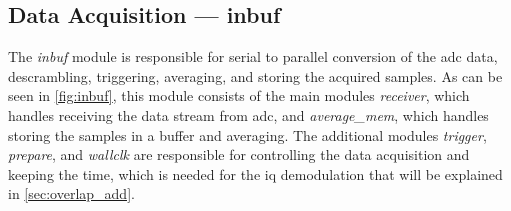 \documentclass[12pt,a4paper,parskip=full,abstract=true,BCOR=12mm]{scrreprt}
\def\device#1{\mbox{\textit{#1}}}
\begin{document}

\subsection[Data Acquisition]{Data Acquisition --- inbuf}
\label{sec:acquisition}

The \device{inbuf} module is responsible for serial to parallel conversion
of the \gls{adc} data, descrambling, triggering, averaging, and storing
the acquired samples. As can be seen in \cref{fig:inbuf}, this module consists
of the main modules \device{receiver}, which handles receiving the data stream from
\gls{adc}, and \device{average\_mem}, which handles storing the samples in a buffer
and averaging. The additional modules \device{trigger}, \device{prepare}, and
\device{wallclk} are responsible for controlling the data acquisition and keeping
the time, which is needed for the \gls{iq} demodulation that will be explained in \cref{sec:overlap_add}.
\end{document}
